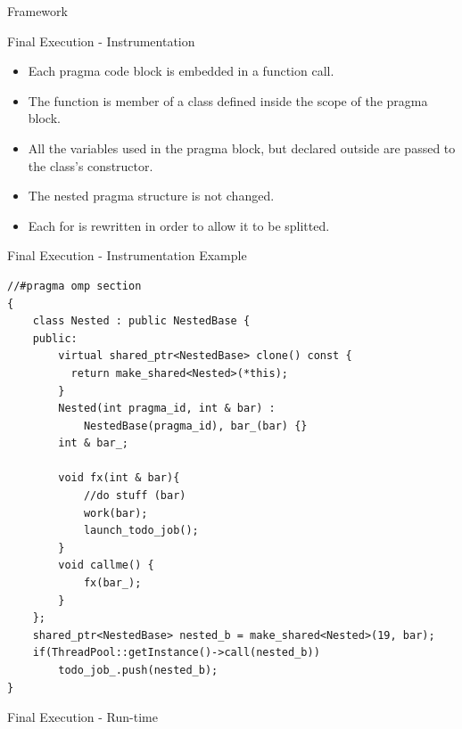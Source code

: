 \documentclass[xcolor=dvipsnames]{beamer}
\begin{document}
\begin{section}{Framework}
\begin{frame}{\hskip 0.3cm Final Execution - Instrumentation}
\begin{itemize}
\item Each pragma code block is embedded in a function call.

\item The function is member of a class defined inside the scope of the pragma block.

\item All the variables used in the pragma block, but declared outside are passed to the class's constructor.

\item The nested pragma structure is not changed.

\item Each for is rewritten in order to allow it to be splitted.

\end{itemize}





\end{frame}













\begin{frame}[fragile]{\hskip 0.3cm Final Execution - Instrumentation Example}

\begin{lstlisting}[language=CCC]
 //#pragma omp section
{
    class Nested : public NestedBase {
    public: 
        virtual shared_ptr<NestedBase> clone() const { 
          return make_shared<Nested>(*this); 
        } 
        Nested(int pragma_id, int & bar) : 
            NestedBase(pragma_id), bar_(bar) {}
        int & bar_;
            
        void fx(int & bar){   
            //do stuff (bar)
            work(bar);
            launch_todo_job(); 
        }
        void callme() {
            fx(bar_);
        }
    };
    shared_ptr<NestedBase> nested_b = make_shared<Nested>(19, bar);                             
    if(ThreadPool::getInstance()->call(nested_b)) 
        todo_job_.push(nested_b); 
}
\end{lstlisting}


\end{frame}








\begin{frame}{\hskip 0.3cm Final Execution - Run-time }


\end{frame}
\end{section}
\end{document}
